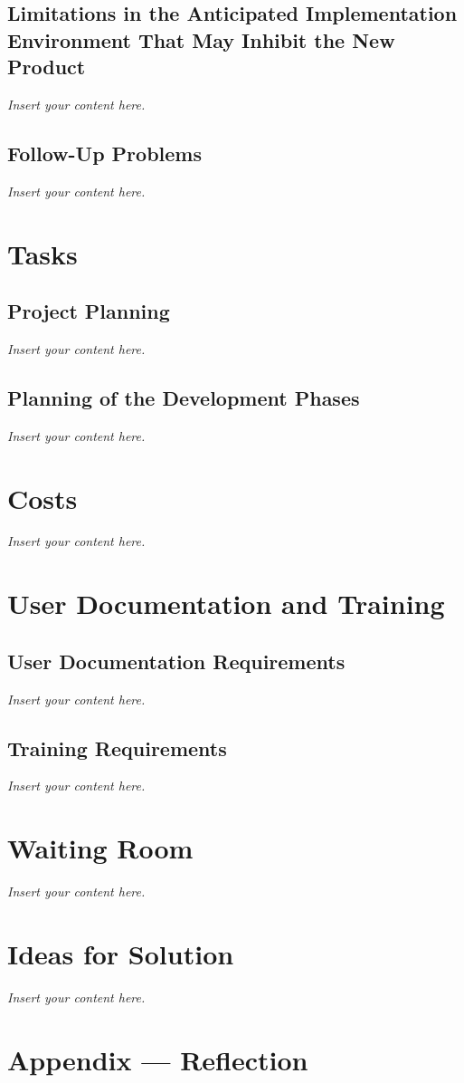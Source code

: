 \documentclass[12pt]{article}
\newcommand{\lips}{\textit{Insert your content here.}}
\begin{document}
\subsection{Limitations in the Anticipated Implementation Environment That May
Inhibit the New Product}
\lips
\subsection{Follow-Up Problems}
\lips

\section{Tasks}
\subsection{Project Planning}
\lips
\subsection{Planning of the Development Phases}
\lips

\section{Costs}
\lips
\section{User Documentation and Training}
\subsection{User Documentation Requirements}
\lips
\subsection{Training Requirements}
\lips

\section{Waiting Room}
\lips

\section{Ideas for Solution}
\lips

\newpage{}
\section*{Appendix --- Reflection}
\end{document}
